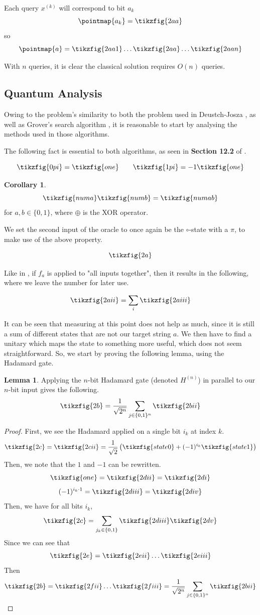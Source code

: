 \documentclass[11pt]{article} %
\theoremstyle{definition}
\newtheorem{corollary}[theorem]{Corollary}
\newtheorem{lemma}[theorem]{Lemma}
\begin{document}
Each query $x^{(k)}$ will correspond to bit $a_k$
\[\pointmap{a_k}=\tikzfig{2aa}\]
so 
\[\pointmap{a}=\tikzfig{2aa1}\dots\tikzfig{2aa}\dots\tikzfig{2aan}\]

With $n$ queries, it is clear the classical solution requires $O(n)$ queries.

\subsection*{Quantum Analysis}
Owing to the problem's similarity to both the problem used in Deustch-Josza \cite{Deutsch_1992},
as well as Grover's search algorithm \cite{Grover_1996}, 
it is reasonable to start by analysing the methods used in those algorithms.

The following fact is essential to both algorithms, as seen in \textbf{Section 12.2} of \cite{coecke2017picturing}.

\[\tikzfig{0pi}=\tikzfig{one}  \quad\quad \tikzfig{1pi}=-1\tikzfig{one}\]

\begin{corollary}
\[\tikzfig{numa}\tikzfig{numb}=\tikzfig{numab}\]
for $a,b\in\{0,1\}$, where $\oplus$ is the XOR operator.
\label{cor:3}
\end{corollary}

We set the second input of the oracle to once again be the $\circ$-state with a $\pi$, 
to make use of the above property.

\[\tikzfig{2a}\]

Like in \cite{coecke2017picturing}, if $f_a$ is applied to "all inputs together",
then it results in the following, where we leave the number for later use.

\[\tikzfig{2aii}=\sum_i\tikzfig{2aiii}\]

It can be seen that measuring at this point does not help as much,
since it is still a sum of different states that are not our target string $a$.
We then have to find a unitary which maps the state to something more useful,
which does not seem straightforward.
So, we start by proving the following lemma, using the Hadamard gate.

\begin{lemma}
Applying the $n$-bit Hadamard gate (denoted $H^{(n)}$) in parallel to our $n$-bit input gives the following.
\[\tikzfig{2b}=\frac{1}{\sqrt{2^n}}\sum_{j\in\{0,1\}^n} \tikzfig{2bii}\]
\label{lem:1}
\end{lemma}

\begin{proof}
First, we see the Hadamard applied on a single bit $i_k$ at index $k$.
\[\tikzfig{2c}=\tikzfig{2cii}=\frac{1}{\sqrt{2}}\left(\tikzfig{state0}+(-1)^{i_k}\tikzfig{state1}\right)\]
Then, we note that the $1$ and $-1$ can be rewritten.
\[\tikzfig{one}=\tikzfig{2dii}= \tikzfig{2di} \]
\[(-1)^{i_k \cdot 1} = \tikzfig{2diii} = \tikzfig{2div}\]
Then, we have for all bits $i_k$,
\[\tikzfig{2c}=\sum_{j_k\in\{0,1\}} \tikzfig{2diii}\tikzfig{2dv}\]
Since we can see that
\[\tikzfig{2e}=\tikzfig{2eii}\dots\tikzfig{2eiii}\]
Then
\[\tikzfig{2b}=\tikzfig{2fii}\dots\tikzfig{2fiii}=\frac{1}{\sqrt{2^n}}\sum_{j\in\{0,1\}^n} \tikzfig{2bii}\]
\end{proof}
\end{document}
